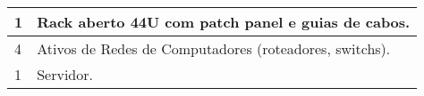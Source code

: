 \begin{table}[h!]
\begin{tabular}{|l|l|l|l|}
1                                                                                & \multicolumn{3}{l|}{Rack aberto 44U com patch panel e guias de cabos.}                                                                                                                                                                                   \\ \hline
4                                                                                & \multicolumn{3}{l|}{Ativos de Redes de Computadores (roteadores, switchs).}                                                                                                                                                                                                                                                                              \\ \hline
 1    & \multicolumn{3}{l|}{Servidor.}                                                                                                                                                                                                                                                                              \\ \hline
\end{tabular}
\end{table}



